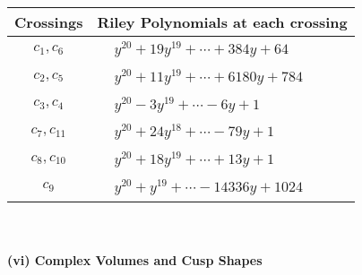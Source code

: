 \documentclass[1p]{elsarticle_modified}
\theoremstyle{definition}
\begin{document}
\begin{tabular}{m{50pt}|m{274pt}}
Crossings & \hspace{64pt}Riley Polynomials at each crossing \\
\hline $$\begin{aligned}c_{1},c_{6}\end{aligned}$$&$\begin{aligned}
&y^{20}+19 y^{19}+\cdots+384 y+64
\end{aligned}$\\
\hline $$\begin{aligned}c_{2},c_{5}\end{aligned}$$&$\begin{aligned}
&y^{20}+11 y^{19}+\cdots+6180 y+784
\end{aligned}$\\
\hline $$\begin{aligned}c_{3},c_{4}\end{aligned}$$&$\begin{aligned}
&y^{20}-3 y^{19}+\cdots-6 y+1
\end{aligned}$\\
\hline $$\begin{aligned}c_{7},c_{11}\end{aligned}$$&$\begin{aligned}
&y^{20}+24 y^{18}+\cdots-79 y+1
\end{aligned}$\\
\hline $$\begin{aligned}c_{8},c_{10}\end{aligned}$$&$\begin{aligned}
&y^{20}+18 y^{19}+\cdots+13 y+1
\end{aligned}$\\
\hline $$\begin{aligned}c_{9}\end{aligned}$$&$\begin{aligned}
&y^{20}+y^{19}+\cdots-14336 y+1024
\end{aligned}$\\
\hline
\end{tabular}\\~\\
\newpage\flushleft \textbf{(vi) Complex Volumes and Cusp Shapes}
\end{document}
